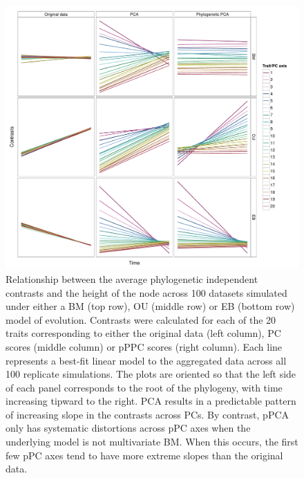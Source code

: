 \documentclass[a4paper,12pt]{article}
\begin{document}
\begin{figure}[p]
\centering
\includegraphics[scale=0.5]{./fig/nh-3models.pdf}
\caption{Relationship between the average phylogenetic independent contrasts and the height of the node across 100 datasets simulated under either a BM (top row), OU (middle row) or EB (bottom row) model of evolution. Contrasts were calculated for each of the 20 traits corresponding to either the original data (left column), PC scores (middle column) or pPPC scores (right column). Each line represents a best-fit linear model to the aggregated data across all 100 replicate simulations. The plots are oriented so that the left side of each panel corresponds to the root of the phylogeny, with time increasing tipward to the right. PCA results in a predictable pattern of increasing slope in the contrasts across PCs. By contrast, pPCA only has systematic distortions across pPC axes when the underlying model is not multivariate BM. When this occurs, the first few pPC axes tend to have more extreme slopes than the original data.}
\label{nhplot}
\end{figure}
\end{document}
